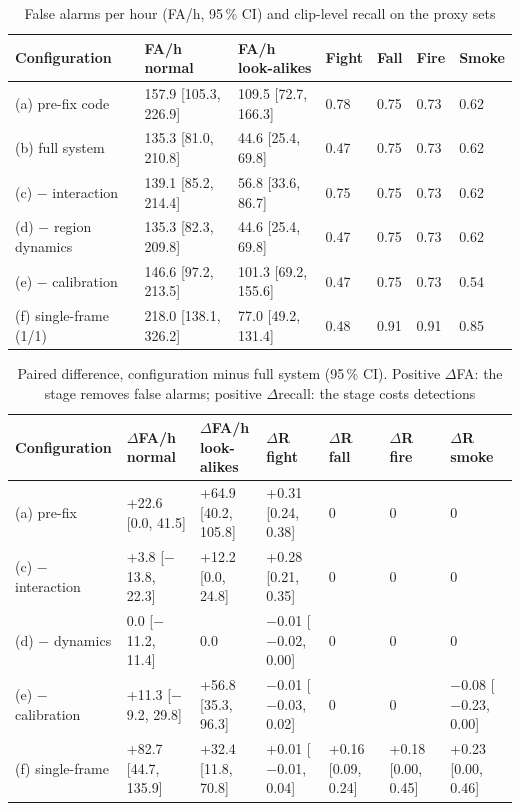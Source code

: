 \documentclass[conference]{IEEEtran}
\begin{document}
\begin{table}[t]
\caption{False alarms per hour (FA/h, 95\,\% CI) and clip-level recall on the proxy sets}
\label{tab:ablation}
\centering
\footnotesize
\begin{tabular}{lllllll}
\toprule
Configuration & FA/h normal & FA/h look-alikes & Fight & Fall & Fire & Smoke \\
\midrule
(a) pre-fix code & 157.9 [105.3, 226.9] & 109.5 [72.7, 166.3] & 0.78 & 0.75 & 0.73 & 0.62 \\
(b) full system & 135.3 [81.0, 210.8] & 44.6 [25.4, 69.8] & 0.47 & 0.75 & 0.73 & 0.62 \\
(c) $-$ interaction & 139.1 [85.2, 214.4] & 56.8 [33.6, 86.7] & 0.75 & 0.75 & 0.73 & 0.62 \\
(d) $-$ region dynamics & 135.3 [82.3, 209.8] & 44.6 [25.4, 69.8] & 0.47 & 0.75 & 0.73 & 0.62 \\
(e) $-$ calibration & 146.6 [97.2, 213.5] & 101.3 [69.2, 155.6] & 0.47 & 0.75 & 0.73 & 0.54 \\
(f) single-frame (1/1) & 218.0 [138.1, 326.2] & 77.0 [49.2, 131.4] & 0.48 & 0.91 & 0.91 & 0.85 \\
\bottomrule
\end{tabular}
\end{table}

\begin{table}[t]
\caption{Paired difference, configuration minus full system (95\,\% CI). Positive $\Delta$FA: the stage removes false alarms; positive $\Delta$recall: the stage costs detections}
\label{tab:paired}
\centering
\footnotesize
\begin{tabular}{lllllll}
\toprule
Configuration & $\Delta$FA/h normal & $\Delta$FA/h look-alikes & $\Delta$R fight & $\Delta$R fall & $\Delta$R fire & $\Delta$R smoke \\
\midrule
(a) pre-fix & +22.6 [0.0, 41.5] & +64.9 [40.2, 105.8] & +0.31 [0.24, 0.38] & 0 & 0 & 0 \\
(c) $-$ interaction & +3.8 [$-$13.8, 22.3] & +12.2 [0.0, 24.8] & +0.28 [0.21, 0.35] & 0 & 0 & 0 \\
(d) $-$ dynamics & 0.0 [$-$11.2, 11.4] & 0.0 & $-$0.01 [$-$0.02, 0.00] & 0 & 0 & 0 \\
(e) $-$ calibration & +11.3 [$-$9.2, 29.8] & +56.8 [35.3, 96.3] & $-$0.01 [$-$0.03, 0.02] & 0 & 0 & $-$0.08 [$-$0.23, 0.00] \\
(f) single-frame & +82.7 [44.7, 135.9] & +32.4 [11.8, 70.8] & +0.01 [$-$0.01, 0.04] & +0.16 [0.09, 0.24] & +0.18 [0.00, 0.45] & +0.23 [0.00, 0.46] \\
\bottomrule
\end{tabular}
\end{table}
\end{document}
